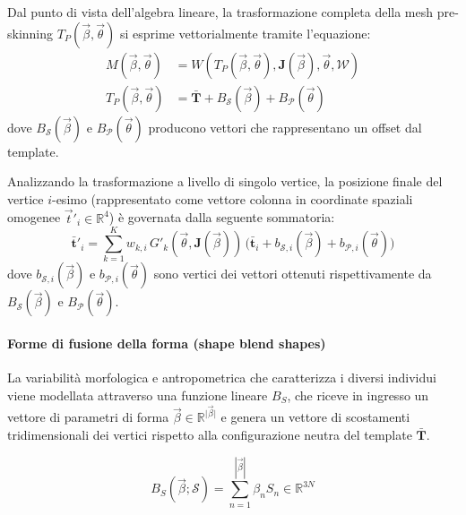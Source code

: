 Dal punto di vista dell'algebra lineare, la trasformazione completa della mesh pre-skinning $T_P(\vec{\beta}, \vec{\theta})$ si esprime vettorialmente tramite l'equazione:
\begin{align}
    M(\vec{\beta}, \vec{\theta}) &= W(T_P(\vec{\beta}, \vec{\theta}), \mathbf{J}(\vec{\beta}), \vec{\theta}, \mathcal{W})\\
    T_P(\vec{\beta}, \vec{\theta}) &= \bar{\mathbf{T}} + B_{\mathcal{S}}(\vec{\beta}) + B_{\mathcal{P}}(\vec{\theta})
\end{align}
dove $B_{\mathcal{S}}(\vec{\beta})$ e $B_{\mathcal{P}}(\vec{\theta})$ producono vettori che rappresentano un offset dal template.

Analizzando la trasformazione a livello di singolo vertice, la posizione finale del vertice $i$-esimo (rappresentato come vettore colonna in coordinate spaziali omogenee $\vec{t}'_i \in \mathbb{R}^4$) è governata dalla seguente sommatoria:
\begin{equation}
    \bar{\mathbf{t}}'_i = \sum_{k=1}^K w_{k,i} \, G'_k(\vec{\theta}, \mathbf{J}(\vec{\beta})) \, \Big( \bar{\mathbf{t}}_i + b_{\mathcal{S},i}(\vec{\beta}) + b_{\mathcal{P},i}(\vec{\theta}) \Big)
\end{equation}
dove $b_{\mathcal{S},i}(\vec{\beta})$ e $b_{\mathcal{P},i}(\vec{\theta})$ sono vertici dei vettori ottenuti rispettivamente da $B_{\mathcal{S}}(\vec{\beta})$ e $B_{\mathcal{P}}(\vec{\theta})$.


\paragraph{Forme di fusione della forma (shape blend shapes)}

La variabilità morfologica e antropometrica che caratterizza i diversi individui viene modellata attraverso una funzione lineare $B_S$, che riceve in ingresso un vettore di parametri di forma $\vec{\beta} \in \mathbb{R}^{\vert \vec{\beta} \vert}$ e genera un vettore di scostamenti tridimensionali dei vertici rispetto alla configurazione neutra del template $\bar{\mathbf{T}}$.

\begin{equation}
B_S(\vec{\beta}; \mathcal{S}) = \sum_{n=1}^{|\vec{\beta}|} \beta_n S_n \in \mathbb{R}^{3N}
\end{equation}

